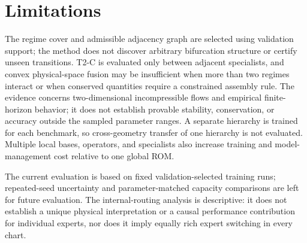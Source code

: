 \section{Limitations}

The regime cover and admissible adjacency graph are selected using validation support;
the method does not discover arbitrary bifurcation structure or certify unseen
transitions. T2-C is evaluated only between adjacent specialists, and convex
physical-space fusion may be insufficient when more than two regimes interact or when
conserved quantities require a constrained assembly rule. The evidence concerns
two-dimensional incompressible flows and empirical finite-horizon behavior; it does not
establish provable stability, conservation, or accuracy outside the sampled parameter
ranges. A separate hierarchy is trained for each benchmark, so cross-geometry transfer
of one hierarchy is not evaluated. Multiple local bases, operators, and specialists also
increase training and model-management cost relative to one global ROM.

The current evaluation is based on fixed validation-selected training runs; repeated-seed
uncertainty and parameter-matched capacity comparisons are left for future evaluation.
The internal-routing analysis is descriptive: it does not establish a unique
physical interpretation or a causal performance contribution for individual
experts, nor does it imply equally rich expert switching in every chart.
